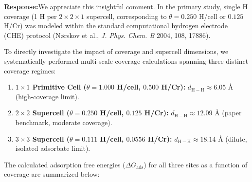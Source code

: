 \documentclass[11pt, sans, a4paper]{moderncv}
\newcommand{\response}{\vspace{0.4em}\noindent\textbf{\color{actionblue}Response:}\hspace{0.5em}}
\begin{document}
\response We appreciate this insightful comment. In the primary study, single H coverage (1 H per $2\times 2\times 1$ supercell, corresponding to $\theta = 0.250$ H/cell or $0.125$ H/Cr) was modeled within the standard computational hydrogen electrode (CHE) protocol (N{\o}rskov et al., \textit{J. Phys. Chem. B} 2004, 108, 17886).

To directly investigate the impact of coverage and supercell dimensions, we systematically performed multi-scale coverage calculations spanning three distinct coverage regimes:
\begin{enumerate}[leftmargin=1.5em, itemsep=0.2em]
\item \textbf{$1\times 1$ Primitive Cell ($\theta = 1.000$ H/cell, $0.500$ H/Cr):} $d_{\mathrm{H-H}} \approx 6.05\text{ \AA}$ (high-coverage limit).
\item \textbf{$2\times 2$ Supercell ($\theta = 0.250$ H/cell, $0.125$ H/Cr):} $d_{\mathrm{H-H}} \approx 12.09\text{ \AA}$ (paper benchmark, moderate coverage).
\item \textbf{$3\times 3$ Supercell ($\theta = 0.111$ H/cell, $0.0556$ H/Cr):} $d_{\mathrm{H-H}} \approx 18.14\text{ \AA}$ (dilute, isolated adsorbate limit).
\end{enumerate}

The calculated adsorption free energies ($\Delta G_{\mathrm{ads}}$) for all three sites as a function of coverage are summarized below:

\begin{center}
\small
{}
\end{center}
\end{document}
